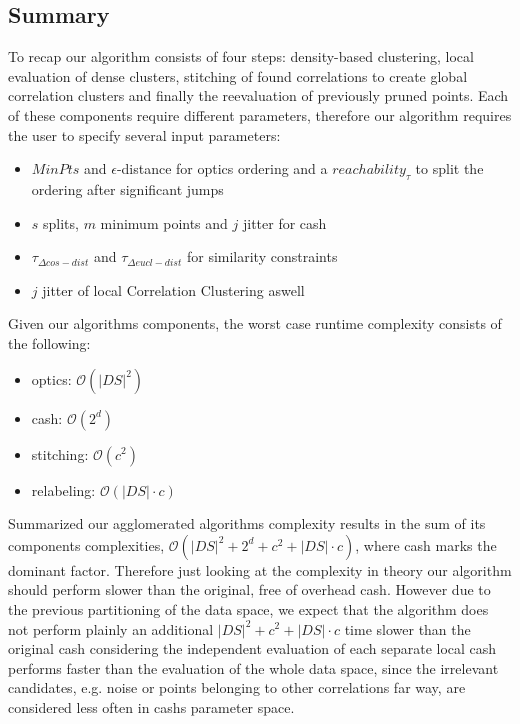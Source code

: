 \subsection{Summary}
To recap our algorithm consists of four steps: density-based clustering, local evaluation of dense clusters, stitching of found correlations to create global correlation clusters and finally the reevaluation of previously pruned points. Each of these components require different parameters, therefore our algorithm requires the user to specify several input parameters:
\begin{itemize}[label={\tiny\raisebox{1ex}{\textbullet}},topsep=6pt,itemsep=-1ex,partopsep=2ex,parsep=2ex]
    \item {} $MinPts$ and $\epsilon$-distance for \gls{optics} ordering and a $reachability_{\tau}$ to split the ordering after significant jumps
    \item {} $s$ splits, $m$ minimum points and $j$ jitter for \gls{cash}
    \item {} $\tau_{\Delta cos-dist}$ and $\tau_{\Delta eucl-dist}$ for similarity constraints
    \item {} $j$ jitter of local Correlation Clustering aswell
\end{itemize}
Given our algorithms components, the worst case runtime complexity consists of the following:
\begin{itemize}[label={\tiny\raisebox{1ex}{\textbullet}},topsep=6pt,itemsep=-1ex,partopsep=2ex,parsep=2ex]
    \item \gls{optics}: $\mathcal{O}(|DS|^2)$
    \item \gls{cash}: $\mathcal{O}(2^d)$
    \item stitching: $\mathcal{O}(c^2)$
    \item relabeling: $\mathcal{O}(|DS| \cdot c)$
\end{itemize}

Summarized our agglomerated algorithms complexity results in the sum of its components complexities, $\mathcal{O}(|DS|^2+2^d+c^2+|DS|\cdot c)$, where \gls{cash} marks the dominant factor.
Therefore just looking at the complexity in theory our algorithm should perform slower than the original, free of overhead \gls{cash}. However due to the previous partitioning of the data space, we expect that the algorithm does not perform plainly an additional $|DS|^2+c^2+|DS|\cdot c$ time slower than the original \gls{cash} considering the independent evaluation of each separate local \gls{cash} performs faster than the evaluation of the whole data space, since the irrelevant candidates, e.g. noise or points belonging to other correlations far way, are considered less often in \gls{cash}s parameter space.

